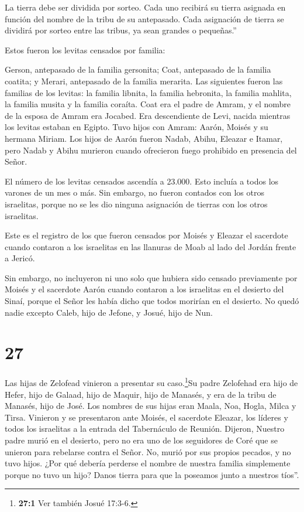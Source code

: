  La tierra debe ser dividida por sorteo. Cada uno recibirá
su tierra asignada en función del nombre de la tribu de su antepasado.
 Cada asignación de tierra se dividirá por sorteo entre las
tribus, ya sean grandes o pequeñas.''

 Estos fueron los levitas censados por familia:

Gerson, antepasado de la familia gersonita; Coat, antepasado de la
familia coatita; y Merari, antepasado de la familia merarita.
 Las siguientes fueron las familias de los levitas: la
familia libnita, la familia hebronita, la familia mahlita, la familia
musita y la familia coraíta. Coat era el padre de Amram,  y
el nombre de la esposa de Amram era Jocabed. Era descendiente de Levi,
nacida mientras los levitas estaban en Egipto. Tuvo hijos con Amram:
Aarón, Moisés y su hermana Miriam.  Los hijos de Aarón
fueron Nadab, Abihu, Eleazar e Itamar,  pero Nadab y Abihu
murieron cuando ofrecieron fuego prohibido en presencia del Señor.

 El número de los levitas censados ascendía a 23.000. Esto
incluía a todos los varones de un mes o más. Sin embargo, no fueron
contados con los otros israelitas, porque no se les dio ninguna
asignación de tierras con los otros israelitas.

 Este es el registro de los que fueron censados por Moisés
y Eleazar el sacerdote cuando contaron a los israelitas en las llanuras
de Moab al lado del Jordán frente a Jericó.

 Sin embargo, no incluyeron ni uno solo que hubiera sido
censado previamente por Moisés y el sacerdote Aarón cuando contaron a
los israelitas en el desierto del Sinaí,  porque el Señor
les había dicho que todos morirían en el desierto. No quedó nadie
excepto Caleb, hijo de Jefone, y Josué, hijo de Nun.

\hypertarget{section-26}{%
\section{27}\label{section-26}}

 Las hijas de Zelofead vinieron a presentar su
caso.\footnote{\textbf{27:1} Ver también Josué 17:3-6.}Su padre
Zelofehad era hijo de Hefer, hijo de Galaad, hijo de Maquir, hijo de
Manasés, y era de la tribu de Manasés, hijo de José. Los nombres de sus
hijas eran Maala, Noa, Hogla, Milca y Tirsa. Vinieron  y se
presentaron ante Moisés, el sacerdote Eleazar, los líderes y todos los
israelitas a la entrada del Tabernáculo de Reunión. Dijeron,
 Nuestro padre murió en el desierto, pero no era uno de los
seguidores de Coré que se unieron para rebelarse contra el Señor. No,
murió por sus propios pecados, y no tuvo hijos.  ¿Por qué
debería perderse el nombre de nuestra familia simplemente porque no tuvo
un hijo? Danos tierra para que la poseamos junto a nuestros tíos''.

